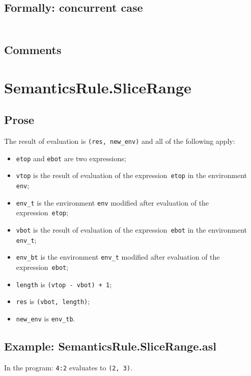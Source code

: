\documentclass{book}
\begin{document}
  \subsection{Formally: concurrent case}
  \begin{align}
  \end{align} 

  \subsection{Comments}

\section{SemanticsRule.SliceRange \label{sec:SemanticsRule.SliceRange}}

  \subsection{Prose}
  The result of evaluation is \texttt{(res, new\_env)} and all of the following apply:
  \begin{itemize}
  \item \texttt{etop} and \texttt{ebot} are two expressions;
  \item \texttt{vtop} is the result of evaluation of the expression~\texttt{etop} in the environment \texttt{env}; 
  \item \texttt{env\_t} is the environment \texttt{env} modified after evaluation of the expression~\texttt{etop}; 
  \item \texttt{vbot} is the result of evaluation of the expression~\texttt{ebot} in the environment \texttt{env\_t}; 
  \item \texttt{env\_bt} is the environment \texttt{env\_t} modified after evaluation of the expression~\texttt{ebot}; 
  \item \texttt{length} is \texttt{(vtop - vbot) + 1};
  \item \texttt{res} is \texttt{(vbot, length)};
  \item \texttt{new\_env} is \texttt{env\_tb}.
  \end{itemize}

  \subsection{Example: SemanticsRule.SliceRange.asl}
  In the program:
  \texttt{4:2} evaluates to \texttt{(2, 3)}.
\end{document}
